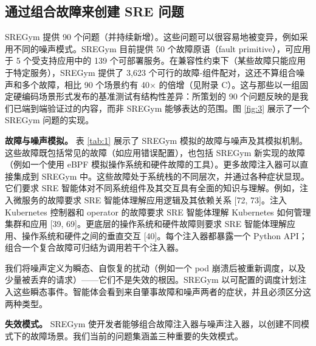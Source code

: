 \documentclass[11pt,UTF8,fontset=fandol]{ctexart}
\begin{document}
\subsection{通过组合故障来创建 SRE 问题}

SREGym 提供 90 个问题（并持续新增）。这些问题可以很容易地被变异，例如采用不同的噪声模式。SREGym 目前提供 50 个故障原语（fault primitive），可应用于 5 个受支持应用中的 139 个可部署服务。在兼容性约束下（某些故障只能应用于特定服务），SREGym 提供了 3,623 个可行的故障-组件配对，这还不算组合噪声和多个故障，相比 90 个场景约有 40$\times$ 的倍增（见附录 C）。这与那些以一组固定硬编码场景形式发布的基准测试有结构性差异：所策划的 90 个问题反映的是我们已端到端验证过的内容，而非 SREGym 能够表达的范围。图 \ref{fig:3} 展示了一个 SREGym 问题的实现。

\textbf{故障与噪声模拟。} 表 \ref{tab:1} 展示了 SREGym 模拟的故障与噪声及其模拟机制。这些故障既包括常见的故障（如应用错误配置），也包括 SREGym 新实现的故障（例如一个使用 eBPF 模拟操作系统和硬件故障的工具）。更多故障注入器可以直接集成到 SREGym 中。这些故障处于系统栈的不同层次，并通过各种症状显现。它们要求 SRE 智能体对不同系统组件及其交互具有全面的知识与理解。例如，注入微服务的故障要求 SRE 智能体理解应用逻辑及其依赖关系 [72, 73]。注入 Kubernetes 控制器和 operator 的故障要求 SRE 智能体理解 Kubernetes 如何管理集群和应用 [39, 69]。更底层的操作系统和硬件故障则要求 SRE 智能体理解应用、操作系统和硬件之间的垂直交互 [40]。每个注入器都暴露一个 Python API；组合一个复合故障可归结为调用若干个注入器。

我们将噪声定义为瞬态、自恢复的扰动（例如一个 pod 崩溃后被重新调度，以及少量被丢弃的请求）——它们不是失效的根因。SREGym 以可配置的调度计划注入这些瞬态事件。智能体会看到来自肇事故障和噪声两者的症状，并且必须区分这两种类型。

\textbf{失效模式。} SREGym 使开发者能够组合故障注入器与噪声注入器，以创建不同模式下的故障场景。我们当前的问题集涵盖三种重要的失效模式。
\end{document}
